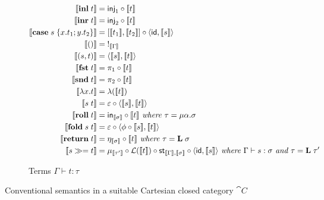 \begin{figure}
\begin{subfigure}{\linewidth}
\begin{align*}
  \\
  \sem{\tmInl{t}} &= \mathsf{inj}_1 \comp \sem{t}
  \\
  \sem{\tmInr{t}} &= \mathsf{inj}_2 \comp \sem{t}
  \\
  \sem{\tmCase{s}{x}{t_1}{y}{t_2}} &= \coprodM{\sem{t_1}}{\sem{t_2}} \comp \prodM{\id}{\sem{s}}
  \\
  \sem{\tmUnit} &=\;!_{\sem{\Gamma}}
  \\
  \sem{\tmPair{s}{t}} &= \prodM{\sem{s}}{\sem{t}}
  \\
  \sem{\tmFst{t}} &= \pi_1 \comp \sem{t}
  \\
  \sem{\tmSnd{t}} &= \pi_2 \comp \sem{t}
  \\
  \sem{\tmFun{x}{t}} &= \lambda(\sem{t})
  \\
  \sem{\tmApp{s}{t}} &= \eval \comp \prodM{\sem{s}}{\sem{t}}
  \\
  \sem{\tmRoll{t}} &= \inMap_{\sem{\sigma}} \comp \sem{t}
  \textit{ where }\tau = \mu\alpha.\sigma
  \\
  \sem{\tmFold{s}{t}} &= \eval \comp \prodM{\phi \comp \sem{s}}{\sem{t}}
  \\
  \sem{\tmReturn{t}} &= \eta_{\sem{\sigma}} \comp \sem{t}
  \textit{ where }\tau = \tyLift\;\sigma
  \\
  \sem{\tmBind{s}{t}} &= \mu_{\sem{\tau'}} \comp \mathcal{L}(\sem{t}) \comp \mathsf{st}_{\sem{\Gamma},\sem{\sigma}} \comp \prodM{\id}{\sem{s}}
  \textit{ where }\Gamma \vdash s: \sigma\textit{ and }\tau = \tyLift\;\tau'
  \end{align*}
  \caption{Terms $\Gamma \vdash t: \tau$}
  \label{fig:default-semantics:terms}
\end{subfigure}
\caption{Conventional semantics in a suitable Cartesian closed category $\cat{C}$}
\end{figure}
